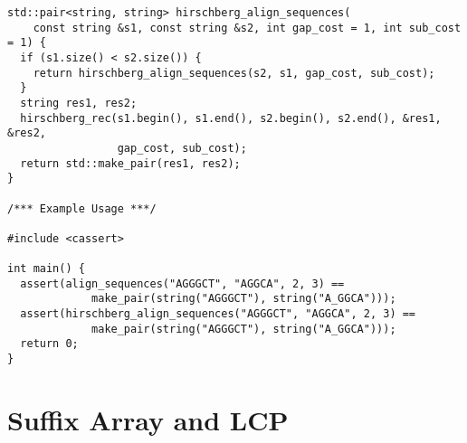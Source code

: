 \begin{lstlisting}
std::pair<string, string> hirschberg_align_sequences(
    const string &s1, const string &s2, int gap_cost = 1, int sub_cost = 1) {
  if (s1.size() < s2.size()) {
    return hirschberg_align_sequences(s2, s1, gap_cost, sub_cost);
  }
  string res1, res2;
  hirschberg_rec(s1.begin(), s1.end(), s2.begin(), s2.end(), &res1, &res2,
                 gap_cost, sub_cost);
  return std::make_pair(res1, res2);
}

/*** Example Usage ***/

#include <cassert>

int main() {
  assert(align_sequences("AGGGCT", "AGGCA", 2, 3) ==
             make_pair(string("AGGGCT"), string("A_GGCA")));
  assert(hirschberg_align_sequences("AGGGCT", "AGGCA", 2, 3) ==
             make_pair(string("AGGGCT"), string("A_GGCA")));
  return 0;
}
\end{lstlisting}

\section{Suffix Array and LCP}
\setcounter{section}{5}
\setcounter{subsection}{0}
